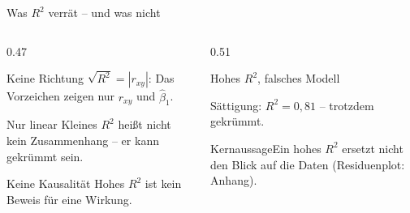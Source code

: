 \documentclass[aspectratio=169,11pt]{beamer}
\newcommand{\kernaussage}[1]{\begin{alertblock}{Kernaussage}#1\end{alertblock}}
\newcommand{\saettpunkte}{\addplot[only marks, mark=*, mark size=2.2pt, color=hsbiblue]
  coordinates {(1,25) (2,32) (3,37) (4,41) (5,44) (6,46) (7,47) (8,48) (9,48) (10,47)};}
\begin{document}
\begin{frame}{Was $R^{2}$ verrät -- und was nicht}
  \begin{columns}[T]
    \begin{column}{0.47\textwidth}
      \begin{block}{Keine Richtung}
        $\sqrt{R^{2}} = |r_{xy}|$: Das Vorzeichen zeigen nur $r_{xy}$ und $\hat{\beta}_1$.
      \end{block}
      \begin{block}{Nur linear}
        Kleines $R^{2}$ heißt nicht \glqq kein Zusammenhang\grqq{} -- er kann
        gekrümmt sein.
      \end{block}
      \begin{block}{Keine Kausalität}
        Hohes $R^{2}$ ist kein Beweis für eine Wirkung.
      \end{block}
    \end{column}
    \begin{column}{0.51\textwidth}
      \begin{alertblock}{Hohes $R^{2}$, falsches Modell}
        {\centering
        \par}
        Sättigung: $R^{2} = 0{,}81$ -- trotzdem gekrümmt.
      \end{alertblock}
      \kernaussage{Ein hohes $R^{2}$ ersetzt nicht den Blick auf die Daten
        (Residuenplot: Anhang).}
    \end{column}
  \end{columns}
\end{frame}
\end{document}
